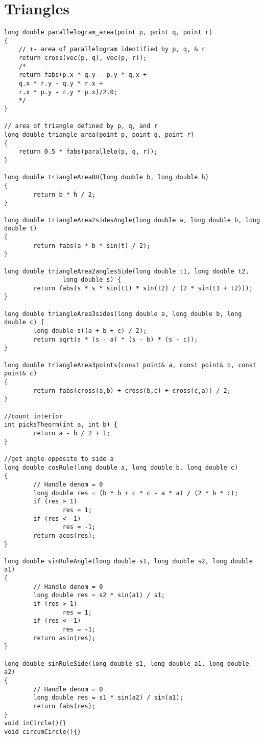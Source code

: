 \documentclass[12pt]{book}
\begin{document}
\section{Triangles}
\begin{verbatim}
long double parallelogram_area(point p, point q, point r)
{
	// +- area of parallelogram identified by p, q, & r
	return cross(vec(p, q), vec(p, r));
	/*
	return fabs(p.x * q.y - p.y * q.x +
	q.x * r.y - q.y * r.x +
	r.x * p.y - r.y * p.x)/2.0;
	*/
}

// area of triangle defined by p, q, and r
long double triangle_area(point p, point q, point r)
{
	return 0.5 * fabs(parallelo(p, q, r));
}

long double triangleAreaBH(long double b, long double h)
{
        return b * h / 2;
}

long double triangleArea2sidesAngle(long double a, long double b, long double t)
{
        return fabs(a * b * sin(t) / 2);
}

long double triangleArea2anglesSide(long double t1, long double t2,
                long double s) {
        return fabs(s * s * sin(t1) * sin(t2) / (2 * sin(t1 + t2)));
}

long double triangleArea3sides(long double a, long double b, long double c) {
        long double s((a + b + c) / 2);
        return sqrt(s * (s - a) * (s - b) * (s - c));
}

long double triangleArea3points(const point& a, const point& b, const point& c)
{
        return fabs(cross(a,b) + cross(b,c) + cross(c,a)) / 2;
}

//count interior
int picksTheorm(int a, int b) {
        return a - b / 2 + 1;
}

//get angle opposite to side a
long double cosRule(long double a, long double b, long double c)
{
        // Handle denom = 0
        long double res = (b * b + c * c - a * a) / (2 * b * c);
        if (res > 1)
                res = 1;
        if (res < -1)
                res = -1;
        return acos(res);
}

long double sinRuleAngle(long double s1, long double s2, long double a1)
{
        // Handle denom = 0
        long double res = s2 * sin(a1) / s1;
        if (res > 1)
                res = 1;
        if (res < -1)
                res = -1;
        return asin(res);
}

long double sinRuleSide(long double s1, long double a1, long double a2)
{
        // Handle denom = 0
        long double res = s1 * sin(a2) / sin(a1);
        return fabs(res);
}
void inCircle(){}
void circumCircle(){}
\end{verbatim}
\end{document}
